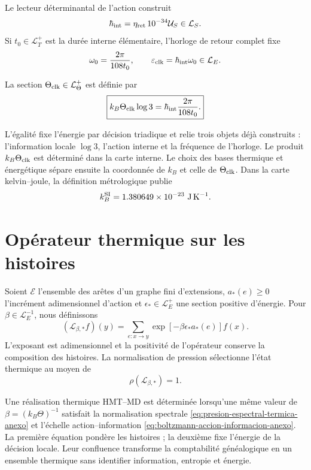 Le lecteur déterminantal de l'action construit
\[
 \hbar_{\rm int}
 =\eta_{\rm ret}\,10^{-34}\mathcal U_S\in\mathcal L_S.
\]
Si \(t_0\in\mathcal L_T^+\) est la durée interne élémentaire, l'horloge de
retour complet fixe
\[
 \omega_0=\frac{2\pi}{108t_0},
 \qquad
 \varepsilon_{\rm clk}=\hbar_{\rm int}\omega_0\in\mathcal L_E.
\]

\begin{definition}
La section \(\Theta_{\rm clk}\in\mathcal L_\Theta^+\) est définie par
\begin{equation}
 \boxed{
 k_B\Theta_{\rm clk}\log3
 =\hbar_{\rm int}\frac{2\pi}{108t_0}.}
 \label{eq:boltzmann-accion-informacion-anexo}
\end{equation}
\end{definition}

L'égalité fixe l'énergie par décision triadique et relie trois objets déjà
construits : l'information locale \(\log3\), l'action interne et la fréquence
de l'horloge. Le produit \(k_B\Theta_{\rm clk}\) est déterminé dans la
carte interne. Le choix des bases thermique et énergétique sépare ensuite la
coordonnée de \(k_B\) et celle de \(\Theta_{\rm clk}\). Dans la carte kelvin--joule,
la définition métrologique publie
\[
 k_B^{\rm SI}=1.380649\times10^{-23}\ \mathrm{J\,K^{-1}}.
\]

\section{Opérateur thermique sur les histoires}

Soient \(\mathcal E\) l'ensemble des arêtes d'un graphe fini d'extensions,
\(a_*(e)\geq0\) l'incrément adimensionnel d'action et
\(\epsilon_*\in\mathcal L_E^+\) une section positive d'énergie. Pour
\(\beta\in\mathcal L_E^{-1}\), nous définissons
\begin{equation}
 (\mathcal L_{\beta,*}f)(y)
 =\sum_{e:x\to y}
 \exp[-\beta\epsilon_*a_*(e)]f(x).
 \label{eq:operador-transferencia-termica-anexo}
\end{equation}
L'exposant est adimensionnel et la positivité de l'opérateur conserve la
composition des histoires. La normalisation de pression sélectionne l'état
thermique au moyen de
\begin{equation}
 \boxed{\rho(\mathcal L_{\beta,*})=1.}
 \label{eq:presion-espectral-termica-anexo}
\end{equation}

\begin{proposition}
\label{prop:confluencia-termica-anexo}
Une réalisation thermique HMT--MD est déterminée lorsqu'une même valeur de
\(\beta=(k_B\Theta)^{-1}\) satisfait la normalisation spectrale
\eqref{eq:presion-espectral-termica-anexo} et l'échelle action--information
\eqref{eq:boltzmann-accion-informacion-anexo}. La première équation pondère les
histoires ; la deuxième fixe l'énergie de la décision locale. Leur confluence
transforme la comptabilité généalogique en un ensemble thermique sans identifier
information, entropie et énergie.
\end{proposition}

